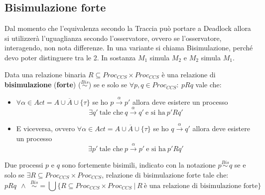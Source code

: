 \subsection{Bisimulazione forte}
Dal momento che l'equivalenza secondo la Traccia può portare a Deadlock
allora si utilizzerà l'uguaglianza secondo l'osservatore, ovvero se l'osservatore,
interagendo, non nota differenze. In una variante si chiama Bisimulazione,
perché devo poter distinguere tra le 2. In sostanza $M_1$ simula $M_2$ e $M_2$
simula $M_1$.
\begin{definizione}
    Data una relazione binaria $R \subseteq Proc_{CCS} \times Proc_{CCS}$ è una
    relazione di \textbf{bisimulazione} (\textbf{forte}) ($\stackrel{Bis}{\sim}$)
    se e solo se $\forall p, q \in Proc_{CCS}: \ p R q$ vale che:
    \begin{itemize}
        \item $\forall \alpha \in Act = A \cup \overline{A} \cup \{\tau\}$ se ho
              $p \xrightarrow{\alpha} p'$ allora deve esistere un processo
              \begin{equation}
                  \exists q' \ \text{tale che} \ q \xrightarrow{\alpha} q' \
                  \text{e si ha} \ p'Rq'
              \end{equation}
        \item E viceversa, ovvero $\forall \alpha \in Act = A \cup \overline{A}
                  \cup \{\tau\}$
              se ho $q \xrightarrow{\alpha} q'$ allora deve esistere un processo
              \begin{equation}
                  \exists p' \ \text{tale che} \ p \xrightarrow{\alpha} p' \
                  \text{e si ha} \ p'Rq'
              \end{equation}
    \end{itemize}
    Due processi $p$ e $q$ sono fortemente bisimili, indicato con la notazione
    $p \stackrel{Bis}{\sim} q$ se e solo se $\exists R \subseteq Proc_{CCS} \times
        Proc_{CCS}$, relazione di bisimulazione forte tale che:
    \begin{equation}
        p R q \ \ \land \ \
        \stackrel{Bis}{\sim} = \bigcup \{R \subseteq Proc_{CCS} \times Proc_{CCS}
        \ | \ R \ \text{è una relazione di bisimulazione forte}\}
    \end{equation}
\end{definizione}
